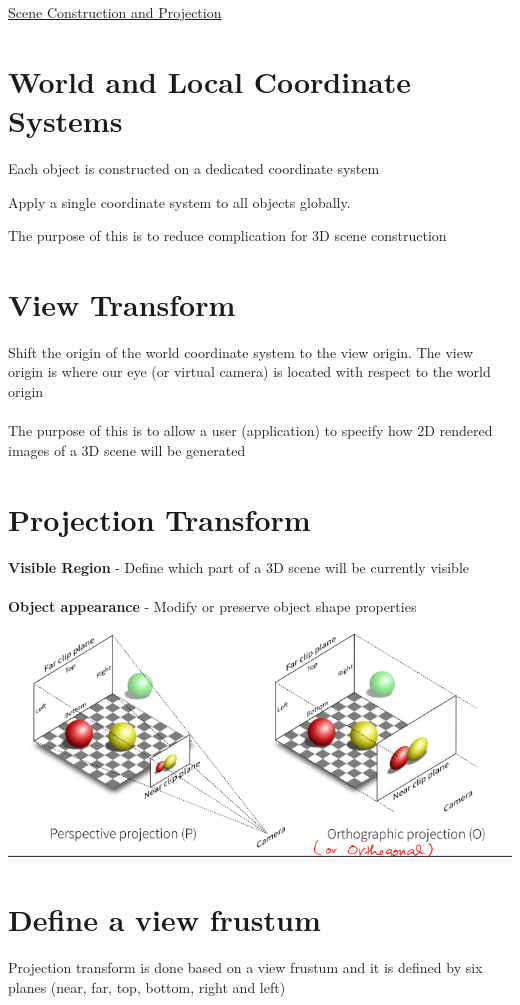 \documentclass{article}[18pt]
\begin{document}
\begin{center}
\underline{\huge Scene Construction and Projection}
\end{center}
\section{World and Local Coordinate Systems}
\begin{definition}
Each object is constructed on a dedicated coordinate system
\end{definition}
\begin{definition}
Apply a single coordinate system to all objects globally.
\end{definition}
The purpose of this is to reduce complication for 3D scene construction
\section{View Transform}
Shift the origin of the world coordinate system to the view origin. The view origin is where our eye (or virtual camera) is located with respect to the world origin\\
\\
The purpose of this is to allow a user (application) to specify how 2D rendered images of a 3D scene will be generated
\section{Projection Transform}
\textbf{Visible Region} - Define which part of a 3D scene will be currently visible\\
\\
\textbf{Object appearance} - Modify or preserve object shape properties
\begin{center}
	\includegraphics[scale=0.7]{"Projection Transform"}
\end{center}
\section{Define a view frustum}
Projection transform is done based on a view frustum and it is defined by six planes (near, far, top, bottom, right and left)
\end{document}
